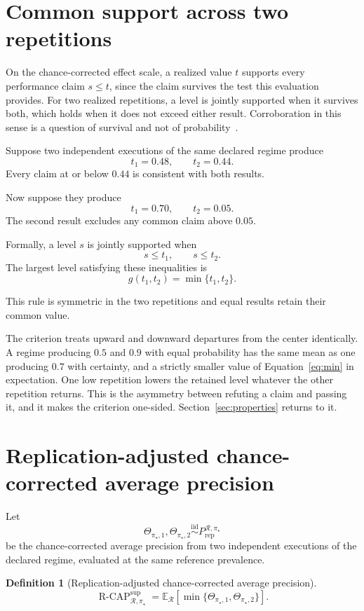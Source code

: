 \documentclass[11pt]{article}
\newcommand{\Regime}{\mathcal{R}}
\newcommand{\E}{\mathbb{E}}
\newcommand{\iid}{\mathrel{\overset{\mathrm{iid}}{\sim}}}
\newcommand{\RCAPfull}{\operatorname{R\text{-}CAP}^{\mathrm{sup}}_{\Regime,\pi_\star}}
\newcommand{\PRep}{P_{\mathrm{rep}}^{\Regime,\pi_\star}}
\newtheorem{definition}{Definition}
\theoremstyle{remark}
\begin{document}
\section{Common support across two repetitions}

On the chance-corrected effect scale, a realized value $t$ supports every performance claim $s\leq t$, since the claim survives the test this evaluation provides. For two realized repetitions, a level is jointly supported when it survives both, which holds when it does not exceed either result. Corroboration in this sense is a question of survival and not of probability~\cite{popper1959logic}.

Suppose two independent executions of the same declared regime produce
\[
t_1=0.48,
\qquad
t_2=0.44.
\]
Every claim at or below $0.44$ is consistent with both results.

Now suppose they produce
\[
t_1=0.70,
\qquad
t_2=0.05.
\]
The second result excludes any common claim above $0.05$.

Formally, a level $s$ is jointly supported when
\[
s\leq t_1,
\qquad
s\leq t_2.
\]
The largest level satisfying these inequalities is
\begin{equation}
g(t_1,t_2)=\min\{t_1,t_2\}.
\label{eq:min}
\end{equation}

This rule is symmetric in the two repetitions and equal results retain their common value. 

The criterion treats upward and downward departures from the center identically. A regime producing $0.5$ and $0.9$ with equal probability has the same mean as one producing $0.7$ with certainty, and a strictly smaller value of Equation~\eqref{eq:min} in expectation. One low repetition lowers the retained level whatever the other repetition returns. This is the asymmetry between refuting a claim and passing it, and it makes the criterion one-sided. Section~\ref{sec:properties} returns to it.

\section{Replication-adjusted chance-corrected average precision}

Let
\[
\Theta_{\pi_\star,1},
\Theta_{\pi_\star,2}
\iid
\PRep
\]
be the chance-corrected average precision from two independent executions of the declared regime, evaluated at the same reference prevalence.

\begin{definition}[Replication-adjusted chance-corrected average precision]
\begin{equation}
\RCAPfull
=
\E_{\Regime}
\left[
\min\{
\Theta_{\pi_\star,1},
\Theta_{\pi_\star,2}
\}
\right].
\label{eq:rcap}
\end{equation}
\end{definition}
\end{document}
